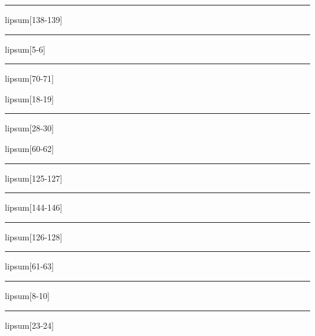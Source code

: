 \documentclass[11pt,a4paper]{article}
\begin{document}
\begin{simplewrap}
  \textcolor{orange!29}{\rule{4.4cm}{2.2cm}}
\end{simplewrap}
lipsum[138-139]

\begin{simplewrap}
  \textcolor{magenta!43}{\rule{5.3cm}{6.4cm}}
\end{simplewrap}
lipsum[5-6]

\begin{simplewrap}
  \textcolor{cyan!12}{\rule{3.8cm}{2.5cm}}
\end{simplewrap}
lipsum[70-71]

lipsum[18-19]

\begin{simplewrap}
  \textcolor{pink!52}{\rule{3.8cm}{8.8cm}}
\end{simplewrap}
lipsum[28-30]

lipsum[60-62]

\begin{simplewrap}
  \textcolor{pink!42}{\rule{5.9cm}{2.8cm}}
\end{simplewrap}
lipsum[125-127]

\begin{simplewrap}
  \textcolor{magenta!15}{\rule{3.6cm}{6.0cm}}
\end{simplewrap}
lipsum[144-146]

\begin{simplewrap}
  \textcolor{red!12}{\rule{3.7cm}{6.2cm}}
\end{simplewrap}
lipsum[126-128]

\begin{simplewrap}
  \textcolor{cyan!11}{\rule{4.0cm}{4.8cm}}
\end{simplewrap}
lipsum[61-63]

\begin{simplewrap}
  \textcolor{cyan!27}{\rule{5.4cm}{7.0cm}}
\end{simplewrap}
lipsum[8-10]

\begin{simplewrap}
  \textcolor{teal!24}{\rule{3.5cm}{9.2cm}}
\end{simplewrap}
lipsum[23-24]
\end{document}
